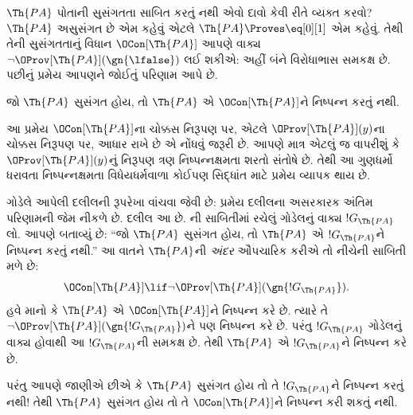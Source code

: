 \begingroup
\makeatletter{}\makeatother


\label{guunit:OLP-0319}


$\Th{PA}$ પોતાની સુસંગતતા સાબિત કરતું નથી એવો દાવો કેવી રીતે વ્યક્ત કરવો? $\Th{PA}$ અસુસંગત છે એમ કહેવું એટલે $\Th{PA} \Proves \eq[0][1]$ એમ કહેવું. તેથી તેની સુસંગતતાનું વિધાન $\OCon[\Th{PA}]$ આપણે વાક્ય $\lnot\OProv[\Th{PA}](\gn{\lfalse})$ લઈ શકીએ: અહીં બંને વિરોધાભાસ સમકક્ષ છે. પછીનું પ્રમેય આપણને જોઈતું પરિણામ આપે છે.

\begin{thm}
જો $\Th{PA}$ સુસંગત હોય, તો $\Th{PA}$ એ $\OCon[\Th{PA}]$ને નિષ્પન્ન કરતું નથી.
\end{thm}

આ પ્રમેય $\OCon[\Th{PA}]$ના ચોક્કસ નિરૂપણ પર, એટલે $\OProv[\Th{PA}](y)$ના ચોક્કસ નિરૂપણ પર, આધાર રાખે છે એ નોંધવું જરૂરી છે. આપણે માત્ર એટલું જ વાપરીશું કે $\OProv[\Th{PA}](y)$નું નિરૂપણ ત્રણ નિષ્પન્નક્ષમતા શરતો સંતોષે છે. તેથી આ ગુણધર્મો ધરાવતા નિષ્પન્નક્ષમતા વિધેયધર્મવાળા કોઈપણ સિદ્ધાંત માટે પ્રમેય વ્યાપક થાય છે.

ગોડેલે આપેલી દલીલની રૂપરેખા વાંચવા જેવી છે: પ્રમેય દલીલના અસરકારક અંતિમ પરિણામની જેમ નીકળે છે. દલીલ આ છે. ની સાબિતીમાં રચેલું ગોડેલનું વાક્ય $!G_\Th{PA}$ લો. આપણે બતાવ્યું છે: ``જો $\Th{PA}$ સુસંગત હોય, તો $\Th{PA}$ એ $!G_\Th{PA}$ને નિષ્પન્ન કરતું નથી.'' આ વાતને $\Th{PA}$ની \emph{અંદર} ઔપચારિક કરીએ તો નીચેની સાબિતી મળે છે:
\[
\OCon[\Th{PA}] \lif \lnot \OProv[\Th{PA}](\gn{!G_\Th{PA}}).
\]
હવે માનો કે $\Th{PA}$ એ $\OCon[\Th{PA}]$ને નિષ્પન્ન કરે છે. ત્યારે તે $\lnot\OProv[\Th{PA}](\gn{!G_\Th{PA}})$ને પણ નિષ્પન્ન કરે છે. પરંતુ $!G_\Th{PA}$ ગોડેલનું વાક્ય હોવાથી આ $!G_\Th{PA}$ની સમકક્ષ છે. તેથી $\Th{PA}$ એ $!G_\Th{PA}$ને નિષ્પન્ન કરે છે.

પરંતુ આપણે જાણીએ છીએ કે $\Th{PA}$ સુસંગત હોય તો તે $!G_\Th{PA}$ને નિષ્પન્ન કરતું નથી!{} તેથી $\Th{PA}$ સુસંગત હોય તો તે $\OCon[\Th{PA}]$ને નિષ્પન્ન કરી શકતું નથી.


